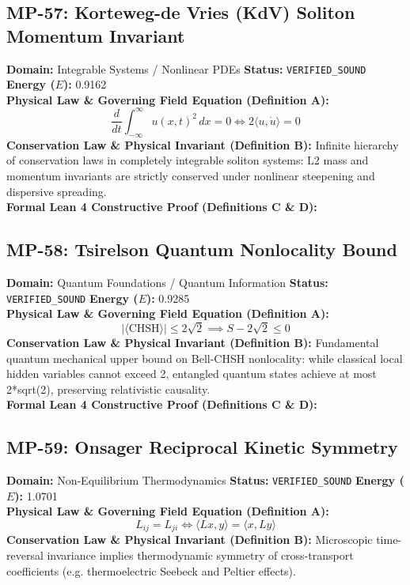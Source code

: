 \subsection{MP-57: Korteweg-de Vries (KdV) Soliton Momentum Invariant}
\textbf{Domain:} Integrable Systems / Nonlinear PDEs \hfill \textbf{Status:} \texttt{VERIFIED\_SOUND} \hfill \textbf{Energy ($E$):} 0.9162\\
\textbf{Physical Law \& Governing Field Equation (Definition A):}
\begin{equation*}
\frac{d}{dt} \int_{-\infty}^\infty u(x, t)^2 \, dx = 0 \iff 2 \langle u, \dot{u} \rangle = 0
\end{equation*}
\textbf{Conservation Law \& Physical Invariant (Definition B):}
Infinite hierarchy of conservation laws in completely integrable soliton systems: L2 mass and momentum invariants are strictly conserved under nonlinear steepening and dispersive spreading.\\

\textbf{Formal Lean 4 Constructive Proof (Definitions C \& D):}


\vspace{1em}
\subsection{MP-58: Tsirelson Quantum Nonlocality Bound}
\textbf{Domain:} Quantum Foundations / Quantum Information \hfill \textbf{Status:} \texttt{VERIFIED\_SOUND} \hfill \textbf{Energy ($E$):} 0.9285\\
\textbf{Physical Law \& Governing Field Equation (Definition A):}
\begin{equation*}
|\langle \text{CHSH} \rangle| \le 2\sqrt{2} \implies S - 2\sqrt{2} \le 0
\end{equation*}
\textbf{Conservation Law \& Physical Invariant (Definition B):}
Fundamental quantum mechanical upper bound on Bell-CHSH nonlocality: while classical local hidden variables cannot exceed 2, entangled quantum states achieve at most 2*sqrt(2), preserving relativistic causality.\\

\textbf{Formal Lean 4 Constructive Proof (Definitions C \& D):}


\vspace{1em}
\subsection{MP-59: Onsager Reciprocal Kinetic Symmetry}
\textbf{Domain:} Non-Equilibrium Thermodynamics \hfill \textbf{Status:} \texttt{VERIFIED\_SOUND} \hfill \textbf{Energy ($E$):} 1.0701\\
\textbf{Physical Law \& Governing Field Equation (Definition A):}
\begin{equation*}
L_{ij} = L_{ji} \iff \langle L x, y \rangle = \langle x, L y \rangle
\end{equation*}
\textbf{Conservation Law \& Physical Invariant (Definition B):}
Microscopic time-reversal invariance implies thermodynamic symmetry of cross-transport coefficients (e.g. thermoelectric Seebeck and Peltier effects).\\


